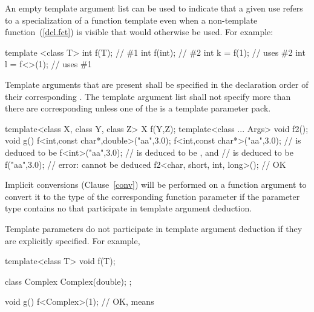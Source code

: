 \pnum
\begin{note}
An empty template argument list can be used to indicate that a given
use refers to a specialization of a function template even when a
non-template function~(\ref{dcl.fct}) is visible that would otherwise be used.
For example:

\begin{codeblock}
template <class T> int f(T);    // \#1
int f(int);                     // \#2
int k = f(1);                   // uses \#2
int l = f<>(1);                 // uses \#1
\end{codeblock}
\end{note}

\pnum
Template arguments that are present shall be specified in the declaration
order of their corresponding
.
The template argument list shall not specify more
than there are corresponding
unless one of the  is a template
parameter pack.
\begin{example}

\begin{codeblock}
template<class X, class Y, class Z> X f(Y,Z);
template<class ... Args> void f2();
void g() {
  f<int,const char*,double>("aa",3.0);
  f<int,const char*>("aa",3.0);       //  is deduced to be 
  f<int>("aa",3.0);             //  is deduced to be , and
                                //  is deduced to be 
  f("aa",3.0);                  // error:  cannot be deduced
  f2<char, short, int, long>(); // OK
}
\end{codeblock}
\end{example}

\pnum
Implicit conversions (Clause~\ref{conv}) will be performed on a function argument
to convert it to the type of the corresponding function parameter if
the parameter type contains no
that participate in template argument deduction.
\begin{note}
Template parameters do not participate in template argument deduction if
they are explicitly specified.
For example,

\begin{codeblock}
template<class T> void f(T);

class Complex {
  Complex(double);
};

void g() {
  f<Complex>(1);                // OK, means 
}
\end{codeblock}
\end{note}


